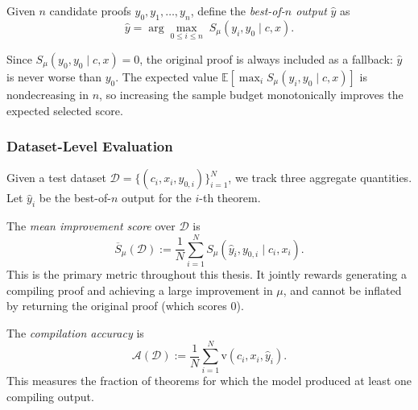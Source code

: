 \begin{definition}\label{def:best_of_n}
Given $n$ candidate proofs $y_0, y_1,\dots,y_n$, define the \emph{best-of-$n$ output} $\hat{y}$ as
\[
\hat{y} = \arg\max_{0 \le i \le n}\; S_\mu(y_i, y_0 \mid c, x).
\]
\end{definition}

Since $S_\mu(y_0, y_0 \mid c, x) = 0$, the original proof is always included as a fallback: $\hat{y}$ is never worse than $y_0$. The expected value $\mathbb{E}[\max_{i} S_\mu(y_i, y_0 \mid c, x)]$ is nondecreasing in $n$, so increasing the sample budget monotonically improves the expected selected score.

\subsubsection{Dataset-Level Evaluation}
\label{sssec:dataset_eval}

Given a test dataset $\mathcal{D} = \{(c_i, x_i, y_{0,i})\}_{i=1}^{N}$, we track three aggregate quantities. Let $\hat{y}_i$ be the best-of-$n$ output for the $i$-th theorem.

\begin{definition}\label{def:mean_improvement}
The \emph{mean improvement score} over $\mathcal{D}$ is
\[
\overline{S}_\mu(\mathcal{D}) := \frac{1}{N}\sum_{i=1}^{N} S_\mu(\hat{y}_i, y_{0,i} \mid c_i, x_i).
\]
This is the primary metric throughout this thesis. It jointly rewards generating a compiling proof and achieving a large improvement in $\mu$, and cannot be inflated by returning the original proof (which scores $0$).
\end{definition}

\begin{definition}\label{def:comp_acc}
The \emph{compilation accuracy} is
\[
\mathcal{A}(\mathcal{D}) := \frac{1}{N}\sum_{i=1}^{N}\mathrm{v}(c_i, x_i, \hat{y}_i).
\]
This measures the fraction of theorems for which the model produced at least one compiling output.
\end{definition}

